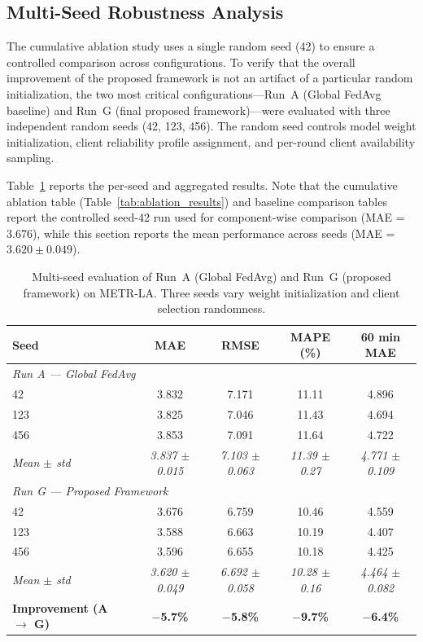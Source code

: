 \subsection{Multi-Seed Robustness Analysis}
\label{sec:multiseed}
The cumulative ablation study uses a single random seed (42) to ensure a controlled comparison across configurations. To verify that the overall improvement of the proposed framework is not an artifact of a particular random initialization, the two most critical configurations---Run~A (Global FedAvg baseline) and Run~G (final proposed framework)---were evaluated with three independent random seeds (42, 123, 456). The random seed controls model weight initialization, client reliability profile assignment, and per-round client availability sampling.

Table~\ref{tab:multiseed} reports the per-seed and aggregated results. Note that the cumulative ablation table (Table~\ref{tab:ablation_results}) and baseline comparison tables report the controlled seed-42 run used for component-wise comparison (MAE = 3.676), while this section reports the mean performance across seeds (MAE = $3.620 \pm 0.049$).

\begin{table}[H]
\centering
\caption{Multi-seed evaluation of Run~A (Global FedAvg) and Run~G (proposed framework) on METR-LA. Three seeds vary weight initialization and client selection randomness.}
\label{tab:multiseed}
\small
\begin{tabular}{l c c c c}
\hline
\textbf{Seed} & \textbf{MAE} & \textbf{RMSE} & \textbf{MAPE (\%)} & \textbf{60 min MAE} \\
\hline
\multicolumn{5}{l}{\textit{Run A --- Global FedAvg}} \\
\hline
42  & 3.832 & 7.171 & 11.11 & 4.896 \\
123 & 3.825 & 7.046 & 11.43 & 4.694 \\
456 & 3.853 & 7.091 & 11.64 & 4.722 \\
\textit{Mean $\pm$ std} & \textit{3.837 $\pm$ 0.015} & \textit{7.103 $\pm$ 0.063} & \textit{11.39 $\pm$ 0.27} & \textit{4.771 $\pm$ 0.109} \\
\hline
\multicolumn{5}{l}{\textit{Run G --- Proposed Framework}} \\
\hline
42  & 3.676 & 6.759 & 10.46 & 4.559 \\
123 & 3.588 & 6.663 & 10.19 & 4.407 \\
456 & 3.596 & 6.655 & 10.18 & 4.425 \\
\textit{Mean $\pm$ std} & \textit{3.620 $\pm$ 0.049} & \textit{6.692 $\pm$ 0.058} & \textit{10.28 $\pm$ 0.16} & \textit{4.464 $\pm$ 0.082} \\
\hline
\textbf{Improvement (A $\to$ G)} & \textbf{$-$5.7\%} & \textbf{$-$5.8\%} & \textbf{$-$9.7\%} & \textbf{$-$6.4\%} \\
\hline
\end{tabular}
\end{table}


